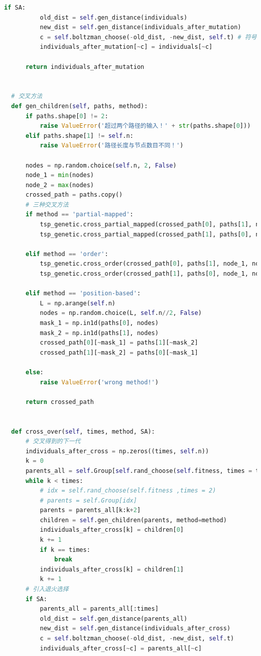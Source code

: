 \documentclass[12pt]{article}
\begin{document}
\begin{lstlisting}[language = Python, caption = GA算法计算TSP的类]
      if SA:
          old_dist = self.gen_distance(individuals)
          new_dist = self.gen_distance(individuals_after_mutation)
          c = self.boltzman_choose(-old_dist, -new_dist, self.t) # 符号表明最小化距离
          individuals_after_mutation[~c] = individuals[~c]

      return individuals_after_mutation


  # 交叉方法
  def gen_children(self, paths, method):
      if paths.shape[0] != 2:
          raise ValueError('超过两个路径的输入！' + str(paths.shape[0]))
      elif paths.shape[1] != self.n:
          raise ValueError('路径长度与节点数目不同！')
      
      nodes = np.random.choice(self.n, 2, False)
      node_1 = min(nodes)
      node_2 = max(nodes)
      crossed_path = paths.copy()
      # 三种交叉方法
      if method == 'partial-mapped':
          tsp_genetic.cross_partial_mapped(crossed_path[0], paths[1], node_1, node_2)
          tsp_genetic.cross_partial_mapped(crossed_path[1], paths[0], node_1, node_2)
      
      elif method == 'order':
          tsp_genetic.cross_order(crossed_path[0], paths[1], node_1, node_2)
          tsp_genetic.cross_order(crossed_path[1], paths[0], node_1, node_2)

      elif method == 'position-based':
          L = np.arange(self.n)
          nodes = np.random.choice(L, self.n//2, False)
          mask_1 = np.in1d(paths[0], nodes)
          mask_2 = np.in1d(paths[1], nodes)
          crossed_path[0][~mask_1] = paths[1][~mask_2]
          crossed_path[1][~mask_2] = paths[0][~mask_1]

      else:
          raise ValueError('wrong method!')

      return crossed_path


  def cross_over(self, times, method, SA):
      # 交叉得到的下一代
      individuals_after_cross = np.zeros((times, self.n))
      k = 0
      parents_all = self.Group[self.rand_choose(self.fitness, times = times+1 if times%2 else times)]
      while k < times:
          # idx = self.rand_choose(self.fitness ,times = 2)
          # parents = self.Group[idx]
          parents = parents_all[k:k+2] 
          children = self.gen_children(parents, method=method)
          individuals_after_cross[k] = children[0]
          k += 1
          if k == times:
              break
          individuals_after_cross[k] = children[1]
          k += 1
      # 引入退火选择
      if SA:
          parents_all = parents_all[:times]
          old_dist = self.gen_distance(parents_all)
          new_dist = self.gen_distance(individuals_after_cross)
          c = self.boltzman_choose(-old_dist, -new_dist, self.t)
          individuals_after_cross[~c] = parents_all[~c]


\end{lstlisting}
\end{document}
